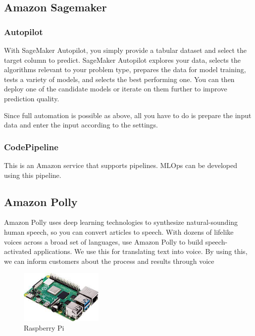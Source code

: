 \subsection{\textbf{Amazon Sagemaker}}
\subsubsection{\textbf{Autopilot}}

 With SageMaker Autopilot, you simply provide a tabular dataset and select the target column to predict. SageMaker Autopilot explores your data, selects the algorithms relevant to your problem type, prepares the data for model training, tests a variety of models, and selects the best performing one. You can then deploy one of the candidate models or iterate on them further to improve prediction quality.

 Since full automation is possible as above, all you have to do is prepare the input data and enter the input according to the settings.

\subsubsection{\textbf{CodePipeline}}

This is an Amazon service that supports pipelines. MLOps can be developed using this pipeline.

\subsection{\textbf{Amazon Polly}}

Amazon Polly uses deep learning technologies to synthesize natural-sounding human speech, so you can convert articles to speech. With dozens of lifelike voices across a broad set of languages, use Amazon Polly to build speech-activated applications.
We use this for translating text into voice. By using this, we can inform customers about the process and results through voice

\begin{figure}[htp]
\centering
\includegraphics[width=4cm]{images/raspberrypi.jpeg}
\caption{Raspberry Pi}
\label{fig:raspberryPi}
\end{figure}

